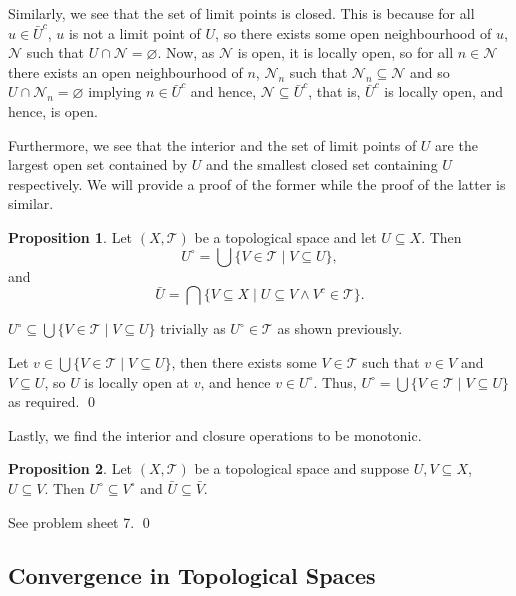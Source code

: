 \documentclass[
]{article}
\theoremstyle{definition}
\newtheorem{prop}{Proposition}
\theoremstyle{definition}
\begin{document}
Similarly, we see that the set of limit points is closed. This is
because for all \(u \in \bar{U}^c\), \(u\) is not a limit point of
\(U\), so there exists some open neighbourhood of \(u\), \(\mathcal{N}\)
such that \(U \cap \mathcal{N} = \varnothing\). Now, as \(\mathcal{N}\)
is open, it is locally open, so for all \(n \in \mathcal{N}\) there
exists an open neighbourhood of \(n\), \(\mathcal{N}_n\) such that
\(\mathcal{N}_n \subseteq \mathcal{N}\) and so
\(U \cap \mathcal{N}_n = \varnothing\) implying \(n \in \bar{U}^c\) and
hence, \(\mathcal{N} \subseteq \bar{U}^c\), that is, \(\bar{U}^c\) is
locally open, and hence, is open.

Furthermore, we see that the interior and the set of limit points of
\(U\) are the largest open set contained by \(U\) and the smallest
closed set containing \(U\) respectively. We will provide a proof of the
former while the proof of the latter is similar.

\begin{prop}
  Let \((X, \mathcal{T})\) be a topological space and let \(U \subseteq X\). 
  Then 
  \[U^\circ = \bigcup \{V \in \mathcal{T} \mid V \subseteq U\},\]
  and 
  \[\bar{U} = \bigcap \{V \subseteq X \mid U \subseteq V \wedge V^c \in \mathcal{T}\}.\]
\end{prop}
\proof

\(U^\circ \subseteq \bigcup \{V \in \mathcal{T} \mid V \subseteq U\}\)
trivially as \(U^\circ \in \mathcal{T}\) as shown previously.

Let \(v \in \bigcup \{V \in \mathcal{T} \mid V \subseteq U\}\), then
there exists some \(V \in \mathcal{T}\) such that \(v \in V\) and
\(V \subseteq U\), so \(U\) is locally open at \(v\), and hence
\(v \in U^\circ\). Thus,
\(U^\circ = \bigcup \{V \in \mathcal{T} \mid V \subseteq U\}\) as
required. \qed

Lastly, we find the interior and closure operations to be monotonic.

\begin{prop}
  Let \((X, \mathcal{T})\) be a topological space and suppose 
  \(U, V \subseteq X\), \(U \subseteq V\). Then \(U^\circ \subseteq V^\circ\) 
  and \(\bar{U} \subseteq \bar{V}\).
\end{prop}
\proof

See problem sheet 7. \qed

\hypertarget{convergence-in-topological-spaces}{%
\subsection{Convergence in Topological
Spaces}\label{convergence-in-topological-spaces}}
\end{document}
